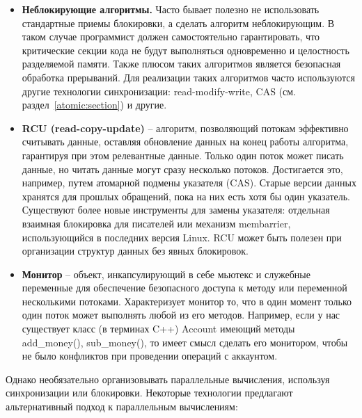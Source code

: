 \begin{itemize}
    \item\textbf{Неблокирующие алгоритмы.} Часто бывает полезно не использовать стандартные приемы блокировки, а сделать алгоритм неблокирующим. В таком случае программист должен самостоятельно гарантировать, что критические секции кода не будут выполняться одновременно и целостность разделяемой памяти. Также плюсом таких алгоритмов является безопасная обработка прерываний. Для реализации таких алгоритмов часто используются другие технологии синхронизации: read-modify-write, CAS (см. раздел~\ref{atomic:section}) и другие.
    
    \item\textbf{RCU (read-copy-update)} -- алгоритм, позволяющий потокам эффективно считывать данные, оставляя обновление данных на конец работы алгоритма, гарантируя при этом релевантные данные. Только один поток может писать данные, но читать данные могут сразу несколько потоков. Достигается это, например, путем атомарной подмены указателя (CAS). Старые версии данных хранятся для прошлых обращений, пока на них есть хотя бы один указатель. Существуют более новые инструменты для замены указателя: отдельная взаимная блокировка для писателей или механизм membarrier, использующийся в последних версия Linux. RCU может быть полезен при организации структур данных без явных блокировок.
    
    \item\textbf{Монитор} -- объект, инкапсулирующий в себе мьютекс и служебные переменные для обеспечение безопасного доступа к методу или переменной несколькими потоками. Характеризует монитор то, что в один момент только один поток может выполнять любой из его методов. Например, если у нас существует класс (в терминах C++) Account имеющий методы add\_money(), sub\_money(), то имеет смысл сделать его монитором, чтобы не было конфликтов при проведении операций с аккаунтом.
\end{itemize}

Однако необязательно организовывать параллельные вычисления, используя синхронизации или блокировки. Некоторые технологии предлагают альтернативный подход к параллельным вычислениям: 

